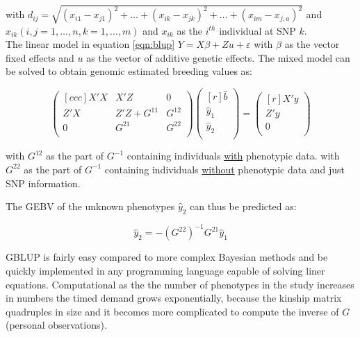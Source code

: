 with $d_{ij} = \sqrt{(x_{i1} -  x_{j1})^2 + \dots + (x_{ik} - x_{jk})^2 + \dots +  (x_{im} - x_{j,a})^2 }$ and
$ x_{ik}(i,j = 1, \dots , n,k = 1, \dots , m)$ and $x_{ik}$ as the $i^{th}$ individual at SNP $k$. \\


The linear model in equation \ref{eqn:blup} $Y = X \beta + Zu + \varepsilon$ with $\beta$ as the vector fixed
effects and $u$ as the vector of additive genetic effects.
The mixed model can be solved to obtain genomic estimated breeding values as:


\begin{equation}
  \begin{pmatrix}[ccc]
    X'X & X'Z & 0 \\ 
    Z'X & Z'Z + G^{11} & G^{12} \\ 
    0 & G^{21} & G^{22} \\ 
  \end{pmatrix}
  \begin{pmatrix}[r]
    \hat{b} \\ 
    \hat{y}_1 \\ 
    \hat{y}_2 \\ 
  \end{pmatrix}
  =
  \begin{pmatrix}[r]
    X'y \\ 
    Z'y \\ 
    0 \\ 
  \end{pmatrix}
  \label{eqn:pBLUP}
\end{equation}

with $G^{12}$ as the part of $G^{-1}$ containing individuals \underline{with} phenotypic data.
with $G^{22}$ as the part of $G^{-1}$ containing individuals \underline{without} phenotypic data and just SNP  information. 

The GEBV of the unknown phenotypes $\hat{y}_2$ can thus be predicted as:

\begin{equation}
\hat{y}_2 = -\left( G^{22}\right)^{-1}G^{21}\hat{y}_1
\label{eqn:gpred}
\end{equation}

GBLUP is fairly easy compared to more complex Bayesian methods and be quickly implemented in any programming
language capable of solving liner equations. Computational as the the number of phenotypes in the study
increases in numbers the timed demand grows exponentially, because the kinship matrix quadruples in size and
it becomes more complicated to compute the inverse of $G$ (personal observations). \\

